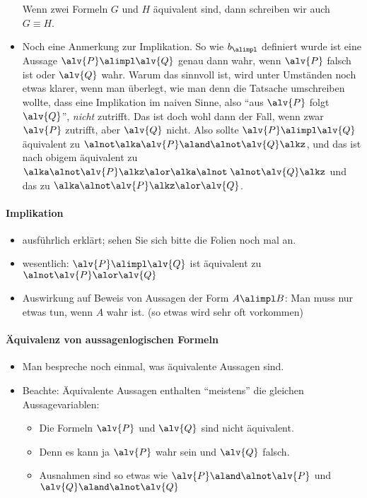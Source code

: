 \begin{itemize}
  Wenn zwei Formeln $G$
  und $H$ äquivalent sind, dann schreiben wir auch $G\equiv H$.
\item Noch eine Anmerkung zur Implikation.
  So wie $b_{\alimpl}$
  definiert wurde ist eine Aussage $\alv{P}\alimpl \alv{Q}$
  genau dann wahr, wenn $\alv{P}$ falsch ist oder $\alv{Q}$ wahr.
  Warum das sinnvoll ist, wird unter Umständen noch etwas klarer, wenn
  man überlegt, wie man denn die Tatsache umschreiben wollte, dass
  eine Implikation im naiven Sinne, also "`aus $\alv{P}$
  folgt $\alv{Q}$"',
  \emph{nicht} zutrifft. Das ist doch wohl dann der Fall, wenn zwar
  $\alv{P}$
  zutrifft, aber $\alv{Q}$
  nicht. Also sollte $\alv{P}\alimpl \alv{Q}$
  äquivalent zu $\alnot\alka\alv{P}\aland \alnot \alv{Q}\alkz$,
  und das ist nach obigem äquivalent zu
  $\alka\alnot \alv{P}\alkz \alor \alka\alnot\;\alnot \alv{Q}\alkz$
  und das zu $\alka\alnot \alv{P}\alkz \alor \alv{Q}$.
\end{itemize}
%
\begin{tutorium}
  \paragraph{Implikation}

  \begin{itemize}
  \item  ausführlich erklärt; sehen Sie sich bitte
    die Folien noch mal an.
  \item wesentlich: $\alv{P}\alimpl \alv{Q}$
    ist äquivalent zu $\alnot \alv{P} \alor \alv{Q}$
  \item Auswirkung auf Beweis von Aussagen der Form $A\alimpl B$: Man muss nur
    etwas tun, wenn $A$ wahr ist.
    (so etwas wird sehr oft vorkommen)
  \end{itemize}
\end{tutorium}
%
\begin{tutorium}
  \paragraph{Äquivalenz von aussagenlogischen Formeln}
  \begin{itemize}
  \item Man bespreche noch einmal, was äquivalente Aussagen sind.
  \item Beachte: Äquivalente Aussagen enthalten "`meistens"' die
    gleichen Aussagevariablen:
    \begin{itemize}
    \item Die Formeln $\alv{P}$ und $\alv{Q}$ sind nicht äquivalent.
    \item Denn es kann ja $\alv{P}$ wahr sein und $\alv{Q}$ falsch.
    \item Ausnahmen sind so etwas wie \zB $\alv{P}\aland \alnot \alv{P}$ und $\alv{Q} \aland
      \alnot \alv{Q}$
    \end{itemize}
  \end{itemize}    
\end{tutorium}
